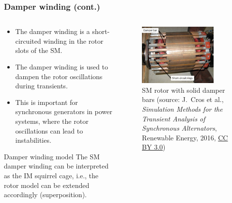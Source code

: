 \begin{frame}
	\frametitle{Damper winding (cont.)}	
    \begin{columns}
		\begin{column}{0.5\textwidth}
			\begin{itemize}
				\item<1-> The damper winding is a short-circuited winding in the rotor slots of the SM.
				\item<2-> The damper winding is used to dampen the rotor oscillations during transients.
				\item<3-> This is important for synchronous generators in power systems, where the rotor oscillations can lead to instabilities.
			\end{itemize}
			\begin{varblock}
				{Damper winding model}
					The SM damper winding can be interpreted as the IM squirrel cage, i.e., the rotor model can be extended accordingly (superposition). 
			\end{varblock}
		\end{column}
        \begin{column}{0.5\textwidth}
			\onslide<1->
            \begin{figure}
                \centering
                \includegraphics[width=0.825\textwidth]{fig/lec07/Salient_pole_damper_winding_02.png}
                \caption{SM rotor with solid damper bars (source: J.~Cros et al., \textit{Simulation Methods for the Transient Analysis of Synchronous Alternators}, Renewable Energy, 2016, \href{https://creativecommons.org/licenses/by/3.0/}{CC BY 3.0})}
                \label{fig:Salient_pole_damper_winding_02}
            \end{figure}
        \end{column}
    \end{columns}
\end{frame}

